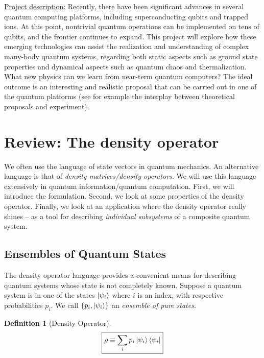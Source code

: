 \documentclass{book}
\theoremstyle{definition}
\newtheorem{defn}{Definition}[section]
\begin{document}
\underline{Project description:} Recently, there have been significant advances in several quantum computing platforms, including superconducting qubits and trapped ions. At this point, nontrivial quantum operations can be implemented
on tens of qubits, and the frontier continues to expand. This project will explore how these emerging
technologies can assist the realization and understanding of complex many-body quantum systems,
regarding both static aspects such as ground state properties and dynamical aspects such as quantum chaos
and thermalization. What new physics can we learn from near-term quantum computers? The ideal
outcome is an interesting and realistic proposal that can be carried out in one of the quantum platforms (see
for example the interplay between theoretical proposals and experiment).














\newpage


\section{Review: The density operator}        

  
We often use the language of state vectors in quantum mechanics. An alternative language is that of \textit{density matrices/density operators}. We will use this language extensively in quantum information/quantum computation. First, we will introduce the formulation. Second, we look at some properties of the density operator. Finally, we look at an application where the density operator really shines -- as a tool for describing \textit{individual subsystems} of a composite quantum system.  


\subsection{Ensembles of Quantum States}

The density operator language provides a convenient means for describing quantum systems whose state is not completely known. Suppose a quantum system is in one of the states $\ket{\psi_i}$ where $i$ is an index, with respective probabilities $p_i$. We call $\{p_i, \ket{\psi_i}\}$ an \textit{ensemble of pure states}. \\

\begin{defn}[Density Operator]
	\begin{align}
	\boxed{\rho \equiv \sum_i p_i \ket{\psi_i}\bra{\psi_i}}
	\end{align}
\end{defn}
\end{document}
